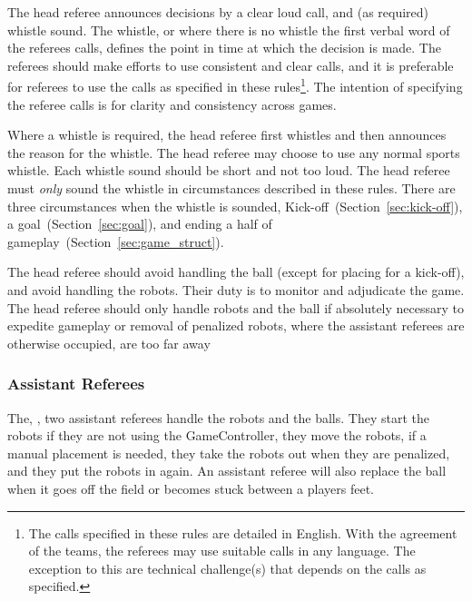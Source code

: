 The head referee announces decisions by a clear loud call, and (as required) whistle sound.
The whistle, or where there is no whistle the first verbal word of the referees calls, defines the point in time at which the decision is made.
The referees should make efforts to use consistent and clear calls, and it is preferable for referees to use the calls as specified in these rules\footnote{The calls specified in these rules are detailed in English. With the agreement of the teams, the referees may use suitable calls in any language. The exception to this are technical challenge(s) that depends on the calls as specified.}.
The intention of specifying the referee calls is for clarity and consistency across games.

Where a whistle is required, the head referee first whistles and then announces the reason for the whistle.
The head referee may choose to use any normal sports whistle.
Each whistle sound should be short and not too loud.
The head referee must \textit{only} sound the whistle in circumstances described in these rules.
There are three circumstances when the whistle is sounded, Kick-off~(\cf Section~\ref{sec:kick-off}), a goal~(\cf Section~\ref{sec:goal}), and ending a half of gameplay~(\cf Section~\ref{sec:game_struct}).

The head referee should avoid handling the ball (except for placing  for a kick-off), and avoid handling the robots.
Their duty is to monitor and adjudicate the game.
The head referee should only handle robots and the ball if absolutely necessary to expedite gameplay or removal of penalized robots, where the assistant referees are otherwise occupied, are too far away 

\subsubsection{Assistant Referees}
\label{sec:assist_referee}
The, , two assistant referees handle the robots and the balls. They start the robots if they are not using the GameController, they move the robots, if a manual placement is needed, they take the robots out when they are penalized, and they put the robots in again. An assistant referee will also replace the ball when it goes off the field or becomes stuck between a players feet.



